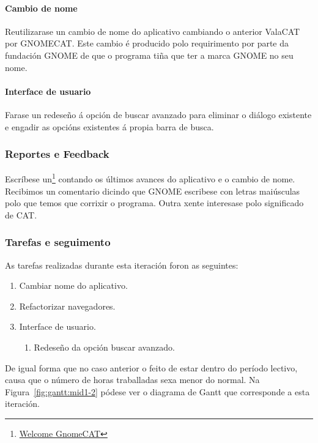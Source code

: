 \paragraph{Cambio de nome} Reutilizarase un cambio de nome do aplicativo cambiando o anterior ValaCAT por GNOMECAT. Este cambio é producido polo requirimento por parte da fundación GNOME de que o programa tiña que ter a marca GNOME no seu nome.

\paragraph{Interface de usuario} Farase un redeseño á opción de buscar avanzado para eliminar o diálogo existente e engadir as opcións existentes á propia barra de busca.

\subsubsection{Reportes e Feedback}
Escríbese un\footnote{\href{http://aquelando.info/welcome-gnomecat/}{Welcome GnomeCAT}} contando os últimos avances do aplicativo e o cambio de nome. Recibimos un comentario dicindo que GNOME escribese con letras maiúsculas polo que temos que corrixir o programa. Outra xente interesase polo significado de CAT.

\subsubsection{Tarefas e seguimento}

As tarefas realizadas durante esta iteración foron as seguintes:

\begin{enumerate}[label=\bfseries WBS 2.\arabic*]
  \item Cambiar nome do aplicativo.
  \item Refactorizar navegadores.
  \item Interface de usuario.
    \begin{enumerate}[label=\bfseries WBS 2.3.\arabic*]
      \item Redeseño da opción buscar avanzado.
    \end{enumerate}
\end{enumerate}

De igual forma que no caso anterior o feito de estar dentro do período lectivo, causa que o número de horas traballadas sexa menor do normal. Na Figura~\ref{fig:gantt:mid1-2} pódese ver o diagrama de Gantt que corresponde a esta iteración.

